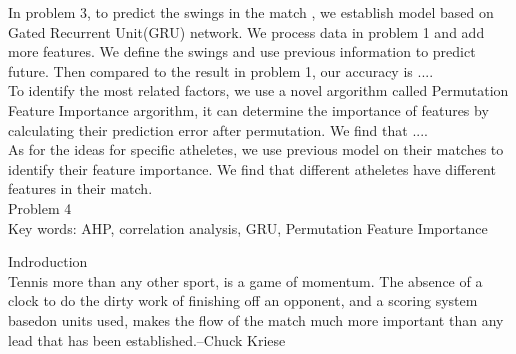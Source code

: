 In problem 3, to predict the swings in the match , we establish model based on Gated Recurrent Unit(GRU) network.
We process data in problem 1 and add more features. We define the swings and use previous information to predict future.
Then compared to the result in problem 1, our accuracy is ....\\

To identify the most related factors, we use a novel argorithm called Permutation Feature Importance argorithm, 
it can determine the importance of features by calculating their prediction error after permutation. We find that ....\\

As for the ideas for specific atheletes, we use previous model on their matches to identify their feature importance.
We find that different atheletes have different features in their match.\\

Problem 4\\

Key words: AHP, correlation analysis, GRU, Permutation Feature Importance

Indroduction\\
Tennis more than any other sport, is a game of momentum. 
The absence of a clock to do the dirty work of finishing off an opponent, 
and a scoring system basedon units used, makes the flow of the match much more important than any 
lead that has been established.--Chuck Kriese\\